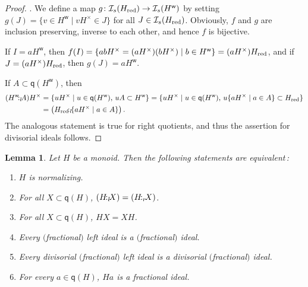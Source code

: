 \documentclass[a4paper]{amsart}
\newtheorem{lemma}[theorem]{Lemma}
\theoremstyle{definition}
\numberwithin{equation}{section}
\begin{document}
\begin{proof}
. We define a map $g \colon \mathcal
I_s(H_{{\text{\rm red}}}) \to \mathcal I_s (H^{\mathsf w})$ by setting $g (J) = \{ v \in H^{\mathsf w} \mid v H^{\times} \in J\}$ for all $J \in \mathcal
I_s(H_{{\text{\rm red}}})$. Obviously, $f$ and $g$ are inclusion preserving, inverse to each other, and hence $f$ is bijective.

If $I = aH^{\mathsf w}$, then $f (I) = \{abH^{\times} = (aH^{\times})(bH^{\times}) \mid b  \in H^{\mathsf w} \} = (aH^{\times}) H_{{\text{\rm red}}}$, and if $J = (aH^{\times}) H_{{\text{\rm red}}}$,
      then $g (J) = a H^{\mathsf w}$.

If $A \subset \mathsf q (H^{\mathsf w})$, then
\[
\begin{aligned}
(H^{\mathsf w} {\negthinspace :_l \negthinspace} A) H^{\times} & = \{ uH^{\times} \mid u \in \mathsf q (H^{\mathsf w}), \, uA \subset H^{\mathsf w} \}
  = \{ uH^{\times} \mid u \in \mathsf q (H^{\mathsf w}), \, u\{a H^{\times} \mid a \in A\} \subset H_{{\text{\rm red}}} \} \\ & = \big( H_{{\text{\rm red}}} {\negthinspace :_l \negthinspace} \{a H^{\times} \mid a \in A \} \big) \,.
\end{aligned}
\]
The analogous statement is true for right quotients, and thus the assertion for divisorial ideals follows.
\end{proof}

\medskip
\begin{lemma} \label{4.5}
Let $H$ be a  monoid. Then the following statements are
equivalent{\rm \,:}
\begin{enumerate}
      \smallskip
      \item[(a)] $H$ is normalizing.

      \smallskip
      \item[(b)] For all $X \subset \mathsf q (H)$, $(H {\negthinspace :_l \negthinspace} X) = (H {\negthinspace :_r \negthinspace} X)$.

      \smallskip
      \item[(c)] For all $X \subset \mathsf q (H)$, $HX = XH$.

      \smallskip
      \item[(d)] Every $($fractional$)$ left ideal is a $($fractional$)$ ideal.

      \smallskip
      \item[(e)] Every  divisorial $($fractional$)$ left ideal is a divisorial  $($fractional$)$  ideal.

      \smallskip
      \item[(f)] For every $a \in \mathsf q (H)$, $Ha$ is a fractional ideal.
\end{enumerate}
\end{lemma}
\end{document}
